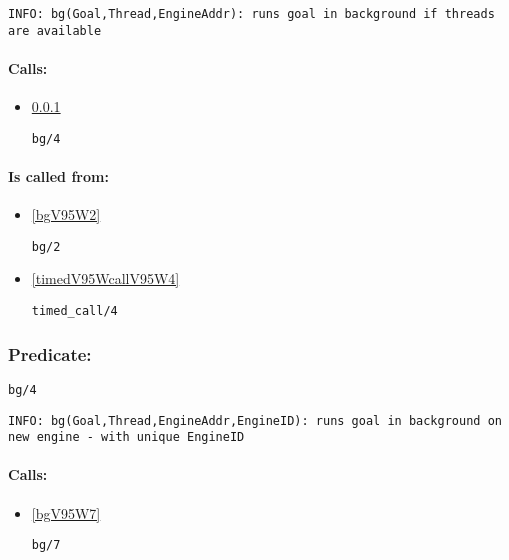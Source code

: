 {\small \begin{verbatim}
INFO: bg(Goal,Thread,EngineAddr): runs goal in background if threads are available

\end{verbatim}}
\paragraph{Calls:} 
\begin{itemize}
\item \ref{bgV95W4} 
\begin{verbatim}
bg/4
\end{verbatim}

\end{itemize}
\paragraph{Is called from:} 
\begin{itemize}
\item \ref{bgV95W2} 
\begin{verbatim}
bg/2
\end{verbatim}

\item \ref{timedV95WcallV95W4} 
\begin{verbatim}
timed_call/4
\end{verbatim}

\end{itemize}

\subsubsection{Predicate:} \label{bgV95W4}

\begin{verbatim}
bg/4
\end{verbatim}

{\small \begin{verbatim}
INFO: bg(Goal,Thread,EngineAddr,EngineID): runs goal in background on new engine - with unique EngineID

\end{verbatim}}
\paragraph{Calls:} 
\begin{itemize}
\item \ref{bgV95W7} 
\begin{verbatim}
bg/7
\end{verbatim}

\end{itemize}

